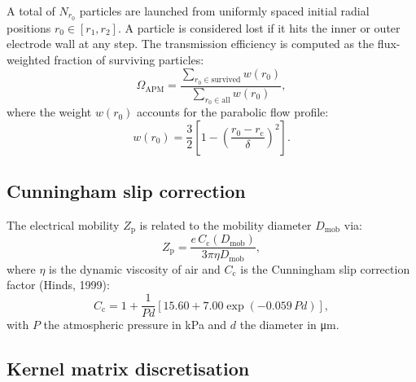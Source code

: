 \documentclass[11pt,a4paper]{article}
\begin{document}
A total of $N_{r_{0}}$ particles are launched from uniformly spaced initial
radial positions $r_{0} \in [r_{1}, r_{2}]$.  A particle is considered lost
if it hits the inner or outer electrode wall at any step.  The transmission
efficiency is computed as the flux-weighted fraction of surviving particles:
\begin{equation}
  \Omega_{\mathrm{APM}}
  = \frac{\displaystyle\sum_{r_{0} \in \text{survived}} w(r_{0})}
         {\displaystyle\sum_{r_{0} \in \text{all}} w(r_{0})},
  \label{eq:transmission}
\end{equation}
where the weight $w(r_{0})$ accounts for the parabolic flow profile:
\begin{equation}
  w(r_{0}) = \frac{3}{2}
    \left[ 1 - \left(\frac{r_{0} - r_{\mathrm{c}}}{\delta}\right)^{2}
    \right].
  \label{eq:flux-weight}
\end{equation}

\subsection{Cunningham slip correction}
\label{sec:cunningham}

The electrical mobility $Z_{\mathrm{p}}$ is related to the mobility diameter
$D_{\mathrm{mob}}$ via:
\begin{equation}
  Z_{\mathrm{p}} =
    \frac{e \, C_{\mathrm{c}}(D_{\mathrm{mob}})}
         {3 \pi \eta D_{\mathrm{mob}}},
  \label{eq:mobility}
\end{equation}
where $\eta$ is the dynamic viscosity of air and $C_{\mathrm{c}}$ is the
Cunningham slip correction factor (Hinds, 1999):
\begin{equation}
  C_{\mathrm{c}} = 1 + \frac{1}{Pd}
    \left[ 15.60 + 7.00 \exp(-0.059 \, Pd) \right],
  \label{eq:cunningham}
\end{equation}
with $P$ the atmospheric pressure in \si{\kilo\pascal} and $d$ the diameter
in \si{\micro\metre}.

\subsection{Kernel matrix discretisation}
\label{sec:kernel-discretisation}
\end{document}
